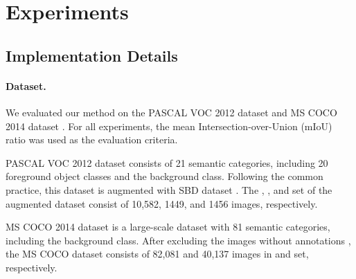 \section{Experiments}
\label{experiments}




\subsection{Implementation Details}
\paragraph{\textbf{Dataset.}}
\par We evaluated our method on the PASCAL VOC 2012 dataset \citep{everingham2010pascal} and MS COCO 2014 dataset \citep{lin2014microsoft}. For all experiments, the mean Intersection-over-Union (mIoU) ratio was used as the evaluation criteria.
\par {PASCAL VOC 2012 dataset} \citep{everingham2010pascal} consists of 21 semantic categories, including 20 foreground object classes and the background class. Following the common practice\citep{chen2017deeplab,wang2020self,chang2020weakly}, this dataset is augmented with SBD dataset \citep{hariharan2011semantic}. The , , and  set of the augmented dataset consist of 10,582, 1449, and 1456 images, respectively.
\par {MS COCO 2014 dataset} \citep{lin2014microsoft} is a large-scale dataset with 81 semantic categories, including the background class. After excluding the images without annotations \citep{lee2021railroad}, the MS COCO dataset consists of 82,081 and 40,137 images in  and  set, respectively.

